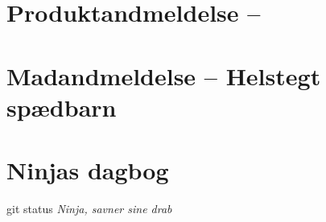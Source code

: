 \begin{minipage}[t]{100mm}
\vspace{1mm}
\section*{Produktandmeldelse -- }


\vspace{1mm}
\section*{Madandmeldelse -- Helstegt spædbarn}
\vspace{2mm}

\section*{Ninjas dagbog}
git status
{\flushright\emph{Ninja, savner sine drab}}

\end{minipage}


